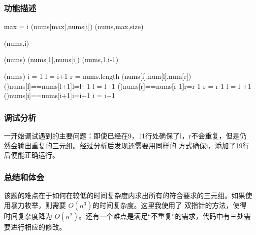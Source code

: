 \subsubsection{功能描述}
\begin{function}
    max = i\;
    {\Swap(nums[max],nums[i])\;
        \Heapify(nums,max,size) \;
    }
    \caption{Heapify(nums,i,size)}
\end{function}
\begin{function}
    {\Heapify(nums,i)}
    \caption{Build-Heap(nums)}
\end{function}
\begin{algorithm}[H]
    \build(nums)\;
    {
        \Swap(nums[1],nums[i])\;
        \Heapify(nums,1,i-1)
    }
    \caption{Heap-Sort(nums)}
\end{algorithm}
\begin{function}[H]
    \Heap(nums)\;
    i = 1\;
    {
        l = i+1\;
        r = nums.length\;
        {
            {
                \print(nums[i],num[l],num[r])\;
                \lWhile(){nums[l]==nums[l+1]}{l=l+1}
                l = l+1\;
                \lWhile(){nums[r]==nums[r-1]}{r=r-1}
                r = r-1\;
            }
            {
                l = l +1\;
            }
        }
        \lWhile(){nums[i]==nums[i+1]}{i=i+1}
        i = i+1\;
    }
    \caption{Triple-Sum(nums)}
\end{function}
\subsubsection{调试分析}
一开始调试遇到的主要问题：即使已经在9，11行处确保了l，r不会重复，但是仍然会输出重复的三元组。经过分析后发现还需要用同样的
方式确保i，添加了19行后便能正确运行。
\subsubsection{总结和体会}
该题的难点在于如何在较低的时间复杂度内求出所有的符合要求的三元组。如果使用暴力枚举，则需要 $O(n^3)$的时间复杂度。这里我使用了
双指针的方法，使得时间复杂度降为 $O(n^2)$。还有一个难点是满足“不重复”的需求，代码中有三处需要进行相应的修改。